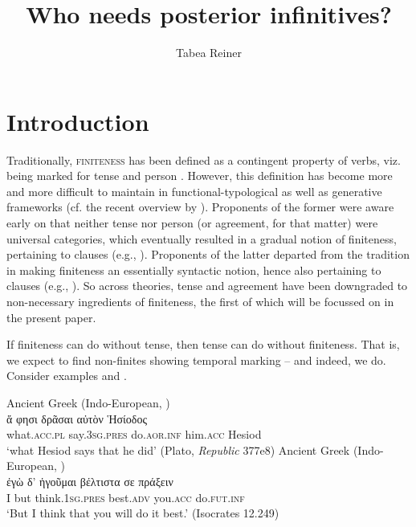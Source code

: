 \documentclass[output=paper,hidelinks]{langscibook}
\author{Tabea Reiner\affiliation{LMU Munich}}
\title{Who needs posterior infinitives?}
\begin{document}
\maketitle

\section{Introduction}\label{sec:reiner:1}
Traditionally, \textsc{finiteness} has been defined as a contingent property of verbs, viz. being marked for tense and person \citep[1]{Nikolaeva2007}. However, this definition has become more and more difficult to maintain in functional-typological as well as generative frameworks (cf. the recent overview by \citealt{Eide2016}). Proponents of the former were aware early on that neither tense nor person (or agreement, for that matter) were universal categories, which eventually resulted in a gradual notion of finiteness, pertaining to clauses (e.g., \citealt[852–864]{Givón1990}). Proponents of the latter departed from the tradition in making finiteness an essentially syntactic notion, hence also pertaining to clauses (e.g., \citealt{RitterWiltschko2014}). So across theories, tense and agreement have been downgraded to non-necessary ingredients of finiteness, the first of which will be focussed on in the present paper.

If finiteness can do without tense, then tense can do without finiteness. That is, we expect to find non-finites showing temporal marking – and indeed, we do. Consider examples  and .

\ea\label{ex:reiner:1}Ancient Greek (Indo-European, \citealt[268]{Kavčič2016})\\
\gll ἅ φησι δρᾶσαι αὐτὸν Ἡσίοδος\\
what.\textsc{acc.pl} say.\textsc{3sg.pres} do.\textsc{aor.inf} him.\textsc{acc} Hesiod\\
\glt ‘what Hesiod says that he did’ (Plato, \textit{Republic} 377e8)
\ex\label{ex:reiner:2}Ancient Greek (Indo-European, \citealt[268]{Kavčič2016})\\
\gll ἐγὼ δ’ ἡγοῦμαι  βέλτιστα σε  πράξειν\\
I  but think.\textsc{1sg.pres} best.\textsc{adv} you.\textsc{acc}  do.\textsc{fut.inf}\\
\glt ‘But I think that you will do it best.’ (Isocrates 12.249)
\z

\end{document}

